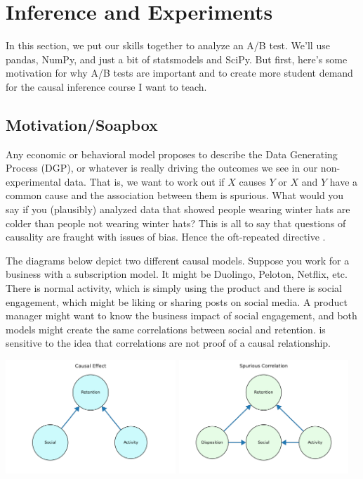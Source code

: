 \section{Inference and Experiments}

In this section, we put our skills together to analyze an A/B test. We'll use pandas, NumPy, and just a bit of statsmodels and SciPy. But first, here's some motivation for why A/B tests are important and to create more student demand for the causal inference course I want to teach. 

\subsection{Motivation/Soapbox}
Any economic or behavioral model proposes to describe the Data Generating Process (DGP), or whatever is really driving the outcomes we see in our non-experimental data. That is, we want to work out if $X$ causes $Y$ or $X$ and $Y$ have a common cause and the association between them is spurious. What would you say if you (plausibly) analyzed data that showed people wearing winter hats are colder than people not wearing winter hats? This is all to say that questions of causality are fraught with issues of bias. Hence the oft-repeated directive .

The diagrams below depict two different causal models. Suppose you work for a business with a subscription model. It might be Duolingo, Peloton, Netflix, etc. There is normal activity, which is simply using the product and there is social engagement, which might be liking or sharing posts on social media. A product manager might want to know the business impact of social engagement, and both models might create the same correlations between social and retention.  is sensitive to the idea that correlations are not proof of a causal relationship.

\begin{center}
    
    \includegraphics[width =0.48\textwidth]{images/causal1.png} \includegraphics[width = 0.48\textwidth]{images/spurious.png}
\end{center}

